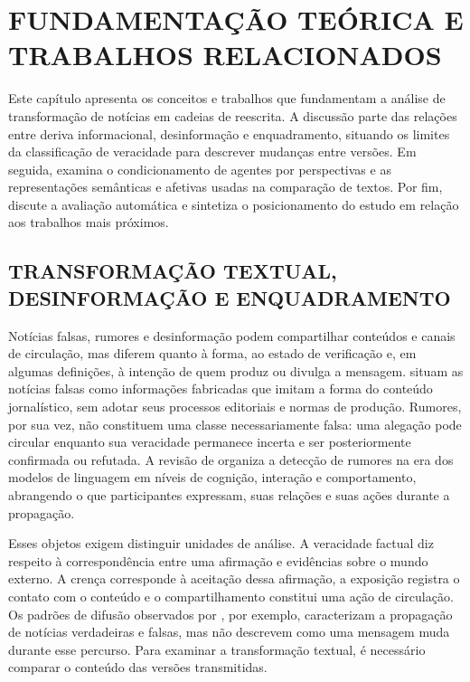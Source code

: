 \chapter{FUNDAMENTAÇÃO TEÓRICA E TRABALHOS RELACIONADOS}
\label{ch:fundamentacao}

Este capítulo apresenta os conceitos e trabalhos que fundamentam a análise de transformação de notícias em cadeias de reescrita. A discussão parte das relações entre deriva informacional, desinformação e enquadramento, situando os limites da classificação de veracidade para descrever mudanças entre versões. Em seguida, examina o condicionamento de agentes por perspectivas e as representações semânticas e afetivas usadas na comparação de textos. Por fim, discute a avaliação automática e sintetiza o posicionamento do estudo em relação aos trabalhos mais próximos.

\section{TRANSFORMAÇÃO TEXTUAL, DESINFORMAÇÃO E ENQUADRAMENTO}
\label{sec:evolucao-enquadramento}

Notícias falsas, rumores e desinformação podem compartilhar conteúdos e canais de circulação, mas diferem quanto à forma, ao estado de verificação e, em algumas definições, à intenção de quem produz ou divulga a mensagem.  situam as notícias falsas como informações fabricadas que imitam a forma do conteúdo jornalístico, sem adotar seus processos editoriais e normas de produção. Rumores, por sua vez, não constituem uma classe necessariamente falsa: uma alegação pode circular enquanto sua veracidade permanece incerta e ser posteriormente confirmada ou refutada. A revisão de  organiza a detecção de rumores na era dos modelos de linguagem em níveis de cognição, interação e comportamento, abrangendo o que participantes expressam, suas relações e suas ações durante a propagação.

Esses objetos exigem distinguir unidades de análise. A veracidade factual diz respeito à correspondência entre uma afirmação e evidências sobre o mundo externo. A crença corresponde à aceitação dessa afirmação, a exposição registra o contato com o conteúdo e o compartilhamento constitui uma ação de circulação. Os padrões de difusão observados por , por exemplo, caracterizam a propagação de notícias verdadeiras e falsas, mas não descrevem como uma mensagem muda durante esse percurso. Para examinar a transformação textual, é necessário comparar o conteúdo das versões transmitidas.

